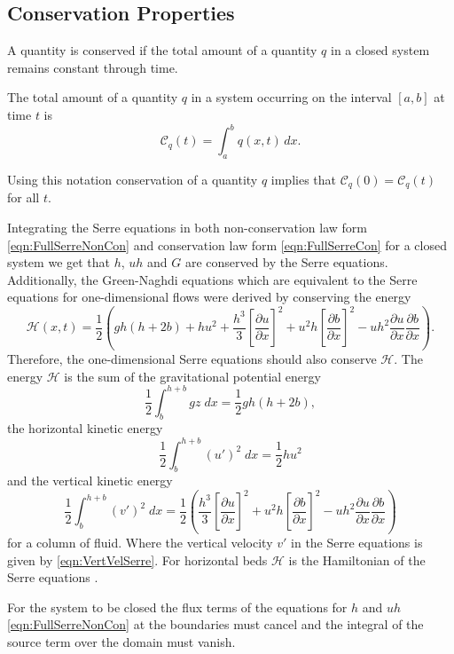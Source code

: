 \subsection{Conservation Properties}
A quantity is conserved if the total amount of a quantity $q$ in a closed system remains constant through time.
\begin{defn}
	\label{defn:TotalAmmountab}
	The total amount of a quantity $q$ in a system occurring on the interval $[a,b]$ at time $t$ is
	\begin{equation*}
	\mathcal{C}_q(t) = \int_{a}^{b} q(x,t)\, dx.
	\end{equation*}
\end{defn}
Using this notation conservation of a quantity $q$ implies that $\mathcal{C}_{q}(0) = \mathcal{C}_{q}(t)$ for all $t$. 

Integrating the Serre equations in both non-conservation law form \eqref{eqn:FullSerreNonCon} and conservation law form \eqref{eqn:FullSerreCon} for a closed system we get that $h$, $uh$ and $G$ are conserved by the Serre equations. Additionally, the Green-Naghdi equations \cite{Green-Naghdi-1976-237} which are equivalent to the Serre equations for one-dimensional flows were derived by conserving the energy
\begin{equation*}
	\mathcal{H}(x,t) = \frac{1}{2} \left( gh\left(h + 2b\right) + hu^2  + \frac{h^3}{3} \left[\frac{\partial u}{\partial x}\right]^2 + u^2h\left[\frac{\partial b}{\partial x}\right]^2 - uh^2 \frac{\partial u}{\partial x} \frac{\partial b}{\partial x}  \right).
	\label{eqn:Hamildef}
\end{equation*}
Therefore, the one-dimensional Serre equations should also conserve $\mathcal{H}$. The energy $\mathcal{H}$ is the sum of the gravitational potential energy
\[\frac{1}{2}\int_{b}^{h +b} gz \; dx = \frac{1}{2}gh\left(h + 2b\right),\]
the horizontal kinetic energy
\[\frac{1}{2}\int_{b}^{h +b} (u')^2 \; dx = \frac{1}{2}hu^2\]
and the vertical kinetic energy
\[\frac{1}{2}\int_{b}^{h +b} (v')^2 \; dx = \frac{1}{2} \left(\frac{h^3}{3} \left[\frac{\partial u}{\partial x}\right]^2 + u^2h\left[\frac{\partial b}{\partial x}\right]^2 - uh^2 \frac{\partial u}{\partial x} \frac{\partial b}{\partial x} \right)\]
for a column of fluid.
Where the vertical velocity $v'$ in the Serre equations is given by \eqref{eqn:VertVelSerre}. For horizontal beds $\mathcal{H}$ is the Hamiltonian of the Serre equations \cite{Li-Y-2002}.
 
For the system to be closed the flux terms of the equations for $h$ and $uh$ \eqref{eqn:FullSerreNonCon} at the boundaries must cancel and the integral of the source term over the domain must vanish.


